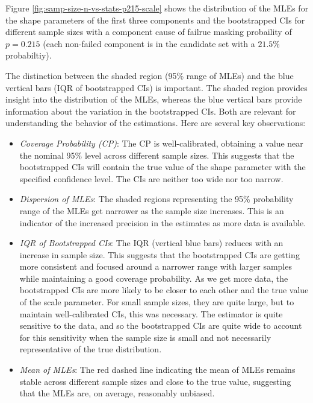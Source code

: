 \documentclass[
]{article}
\begin{document}
Figure \ref{fig:samp-size-n-vs-stats-p215-scale} shows the distribution
of the MLEs for the shape parameters of the first three components and
the bootstrapped CIs for different sample sizes with a component cause
of failrue masking probaility of \(p = 0.215\) (each non-failed
component is in the candidate set with a \(21.5\%\) probabiltiy).

The distinction between the shaded region (95\% range of MLEs) and the
blue vertical bars (IQR of bootstrapped CIs) is important. The shaded
region provides insight into the distribution of the MLEs, whereas the
blue vertical bars provide information about the variation in the
bootstrapped CIs. Both are relevant for understanding the behavior of
the estimations. Here are several key observations:

\begin{itemize}
\item
  \emph{Coverage Probability (CP)}: The CP is well-calibrated, obtaining
  a value near the nominal 95\% level across different sample sizes.
  This suggests that the bootstrapped CIs will contain the true value of
  the shape parameter with the specified confidence level. The CIs are
  neither too wide nor too narrow.
\item
  \emph{Dispersion of MLEs}: The shaded regions representing the 95\%
  probability range of the MLEs get narrower as the sample size
  increases. This is an indicator of the increased precision in the
  estimates as more data is available.
\item
  \emph{IQR of Bootstrapped CIs}: The IQR (vertical blue bars) reduces
  with an increase in sample size. This suggests that the bootstrapped
  CIs are getting more consistent and focused around a narrower range
  with larger samples while maintaining a good coverage probability. As
  we get more data, the bootstrapped CIs are more likely to be closer to
  each other and the true value of the scale parameter. For small sample
  sizes, they are quite large, but to maintain well-calibrated CIs, this
  was necessary. The estimator is quite sensitive to the data, and so
  the bootstrapped CIs are quite wide to account for this sensitivity
  when the sample size is small and not necessarily representative of
  the true distribution.
\item
  \emph{Mean of MLEs}: The red dashed line indicating the mean of MLEs
  remains stable across different sample sizes and close to the true
  value, suggesting that the MLEs are, on average, reasonably unbiased.
\end{itemize}
\end{document}
